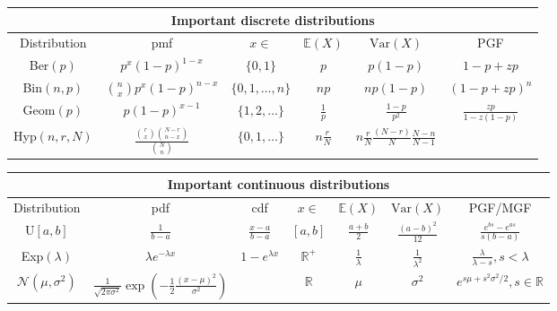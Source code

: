 

\begin{tabular}{ |c|c|c|c|c|c|  }
    \hline
    \multicolumn{6}{|c|}{Important discrete distributions} \\
    \hline
    Distribution & pmf & \(x\in\) & \(\mathbb{E}(X)\)& \(\text{Var}(X)\) & PGF\\
    \hline
    Ber\((p)\)  & \(p^x{(1-p)}^{1-x}\) & \(\{0,1\}\) & \(p\) & \(p(1-p)\) & \(1 - p + zp\)\\
    Bin\((n,p)\)  & \(\binom{n}{x} p^x{(1-p)}^{n-x}\) & \(\{0,1, \ldots, n\}\) & \(np\) & \(np(1-p)\) & \({(1 - p + zp)}^n\)\\
    Geom\((p)\) & \(p{(1-p)}^{x-1}\) & \(\{1,2, \ldots\}\) & \(\frac{1}{p}\)& \(\frac{1-p}{p^2}\) & \(\frac{zp}{1-z(1-p)}\)\\
    Hyp\((n,r,N)\) & \(\frac{\binom{r}{x}\binom{N-r}{n-x}}{\binom{N}{n}}\) & \(\{0,1,\ldots\}\) & \(n\frac{r}{N}\)& \(n\frac{r}{N} \frac{(N-r)}{N} \frac{N-n}{N-1}\) & \\
    \hline
\end{tabular}

\begin{tabular}{ |c|c|c|c|c|c|c|  }
    \hline
    \multicolumn{7}{|c|}{Important continuous distributions} \\
    \hline
    Distribution & pdf & cdf & \(x\in\) & \(\mathbb{E}(X)\)& \(\text{Var}(X)\) & PGF/MGF\\
    \hline
    U\([a,b]\) & \(\frac{1}{b-a}\) & \(\frac{x-a}{b-a}\) & \([a,b]\) & \(\frac{a+b}{2}\) & \(\frac{{\left(a-b\right)}^2}{12}\) & \(\frac{e^{bs}-e^{as}}{s(b-a)}\)\\
    Exp\((\lambda)\) & \(\lambda e^{-\lambda x}\) & \(1 - e^{\lambda x}\)& \(\mathbb{R}^+\) & \(\frac{1}{\lambda}\)& \(\frac{1}{\lambda^2}\) & \(\frac{\lambda}{\lambda - s}, s<\lambda\)\\
    \(\mathcal{N}(\mu,\sigma^2)\) & \(\frac{1}{\sqrt{2\pi\sigma^2}}\exp\left(-\frac{1}{2}\frac{{(x-\mu)}^2}{\sigma^2}\right)\) & & \(\mathbb{R}\) & \(\mu\)& \(\sigma^2\) & \(e^{s\mu+s^2\sigma^2/2}, s\in\mathbb{R}\)\\
    \hline
\end{tabular}
   

